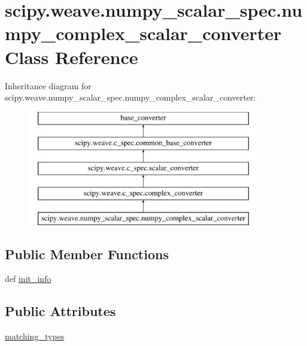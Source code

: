 \hypertarget{classscipy_1_1weave_1_1numpy__scalar__spec_1_1numpy__complex__scalar__converter}{}\section{scipy.\+weave.\+numpy\+\_\+scalar\+\_\+spec.\+numpy\+\_\+complex\+\_\+scalar\+\_\+converter Class Reference}
\label{classscipy_1_1weave_1_1numpy__scalar__spec_1_1numpy__complex__scalar__converter}
Inheritance diagram for scipy.\+weave.\+numpy\+\_\+scalar\+\_\+spec.\+numpy\+\_\+complex\+\_\+scalar\+\_\+converter\+:\begin{figure}[H]
\begin{center}
\leavevmode
\includegraphics[height=5.000000cm]{classscipy_1_1weave_1_1numpy__scalar__spec_1_1numpy__complex__scalar__converter}
\end{center}
\end{figure}
\subsection*{Public Member Functions}
\begin{DoxyCompactItemize}
\item 
def \hyperlink{classscipy_1_1weave_1_1numpy__scalar__spec_1_1numpy__complex__scalar__converter_a5bcc7876dcab355ef64da8b50c552cc5}{init\+\_\+info}
\end{DoxyCompactItemize}
\subsection*{Public Attributes}
\begin{DoxyCompactItemize}
\item 
\hyperlink{classscipy_1_1weave_1_1numpy__scalar__spec_1_1numpy__complex__scalar__converter_a598c1277b0398207e19a68792f171efc}{matching\+\_\+types}
\end{DoxyCompactItemize}


